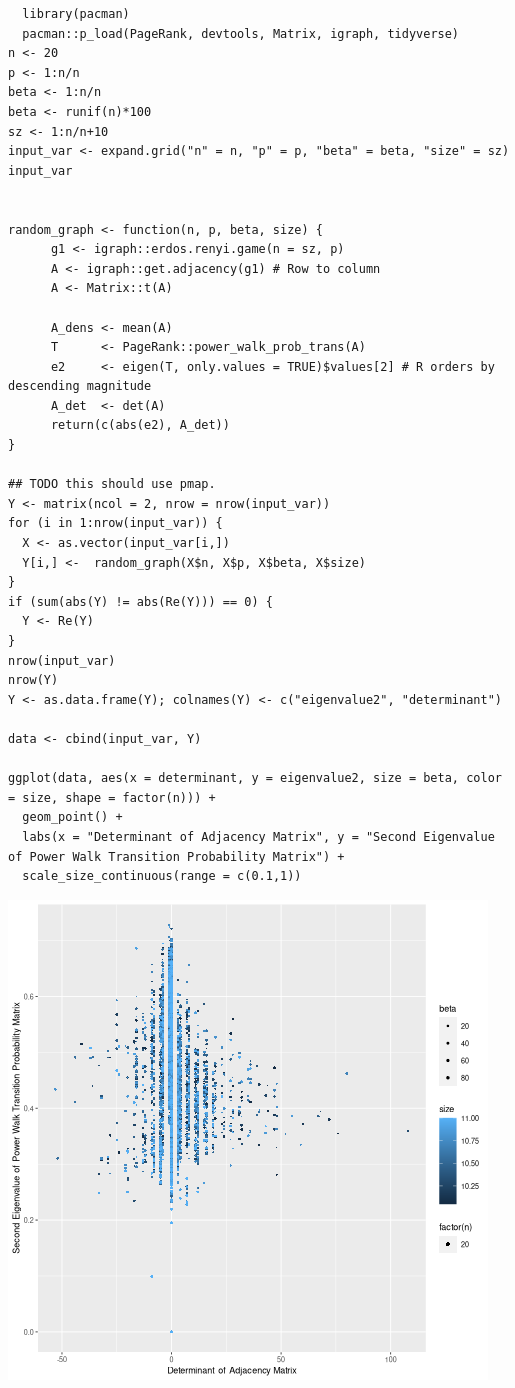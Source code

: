 \documentclass[11pt]{article}
\begin{document}
\begin{verbatim}
  library(pacman)
  pacman::p_load(PageRank, devtools, Matrix, igraph, tidyverse)
n <- 20
p <- 1:n/n
beta <- 1:n/n
beta <- runif(n)*100
sz <- 1:n/n+10
input_var <- expand.grid("n" = n, "p" = p, "beta" = beta, "size" = sz)
input_var


random_graph <- function(n, p, beta, size) {
      g1 <- igraph::erdos.renyi.game(n = sz, p)
      A <- igraph::get.adjacency(g1) # Row to column
      A <- Matrix::t(A)

      A_dens <- mean(A)
      T      <- PageRank::power_walk_prob_trans(A)
      e2     <- eigen(T, only.values = TRUE)$values[2] # R orders by descending magnitude
      A_det  <- det(A)
      return(c(abs(e2), A_det))
}

## TODO this should use pmap.
Y <- matrix(ncol = 2, nrow = nrow(input_var))
for (i in 1:nrow(input_var)) {
  X <- as.vector(input_var[i,])
  Y[i,] <-  random_graph(X$n, X$p, X$beta, X$size)
}
if (sum(abs(Y) != abs(Re(Y))) == 0) {
  Y <- Re(Y)
}
nrow(input_var)
nrow(Y)
Y <- as.data.frame(Y); colnames(Y) <- c("eigenvalue2", "determinant")

data <- cbind(input_var, Y)

ggplot(data, aes(x = determinant, y = eigenvalue2, size = beta, color = size, shape = factor(n))) +
  geom_point() +
  labs(x = "Determinant of Adjacency Matrix", y = "Second Eigenvalue of Power Walk Transition Probability Matrix") +
  scale_size_continuous(range = c(0.1,1))
\end{verbatim}

\begin{center}
\includegraphics[width=.9\linewidth]{../Media/EigenValue_Determinant.png}
\end{center}
\end{document}

